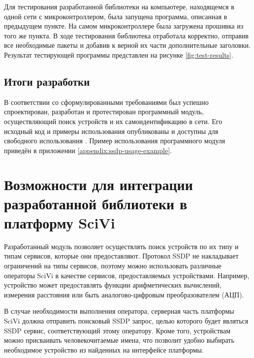 Для тестирования разработанной библиотеки на компьютере, находящемся в одной сети с микроконтроллером, была запущена программа, описанная в предыдущем пункте.
На самом микроконтроллере была загружена прошивка из того же пункта.
В ходе тестирования библиотека отработала корректно, отправив все необходимые пакеты и добавив к верной их части дополнительные заголовки.
Результат тестирующей программы представлен на рисунке \ref{fig:test-results}.


\subsection{Итоги разработки}

В соответствии со сформулированными требованиями был успешно спроектирован, разработан и протестирован программный модуль, осуществляющий поиск устройств и их самоидентификацию в сети.
Его исходный код и примеры использования опубликованы и доступны для свободного использования \cite{web:almiluk-ssdp}.
Пример использования программного модуля приведён в приложении \ref{appendix:ssdp-usage-example}.


\section{Возможности для интеграции разработанной библиотеки в платформу SciVi}


Разработанный модуль позволяет осуществлять поиск устройств по их типу и типам сервисов, которые они предоставляют.
Протокол SSDP не накладывает ограничений на типы сервисов, поэтому можно использовать различные операторы SciVi в качестве сервисов, предоставляемых устройствами.
Например, устройство может предоставлять функции арифметических вычислений, измерения расстояния или быть аналогово-цифровым преобразователем (АЦП).

В случае необходимости выполнения оператора, серверная часть платформы SciVi должна отправить поисковый SSDP запрос, целью которого будет являться SSDP сервис, соответствующий этому оператору.
Кроме того, устройствам можно присваивать человекочитаемые имена, что позволит удобно выбирать необходимое устройство из найденных на интерфейсе платформы.

